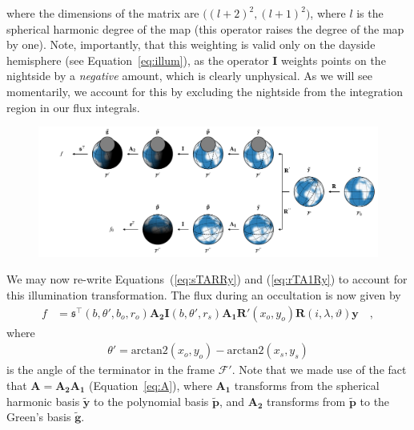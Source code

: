 \documentclass[modern]{aastex62}
\newcommand{\BF}[1]{\ensuremath{\mathbf{#1}}}
\newcommand{\bg}{\ensuremath{\tilde{\BF{g}}}}
\newcommand{\bp}{\ensuremath{\tilde{\BF{p}}}}
\newcommand{\by}{\ensuremath{\tilde{\BF{y}}}}
\begin{document}
%
where the dimensions of the matrix are $\big((l + 2)^2, (l + 1)^2\big)$, where
$l$ is the spherical harmonic degree of the map (this operator raises the
degree of the map by one).
%
Note, importantly, that this weighting is valid only on the dayside
hemisphere (see Equation~\ref{eq:illum}), as the operator $\BF{I}$ weights
points on the nightside by a \emph{negative} amount, which is clearly
unphysical. As we will see momentarily, we account for this by excluding the
nightside from the integration region in our flux integrals.

\begin{figure}[t!]
    \begin{centering}
        \includegraphics[width=\linewidth]{figures/frames.pdf}
    \end{centering}
\end{figure}

We may now re-write Equations~(\ref{eq:sTARRy}) and (\ref{eq:rTA1Ry}) to
account for this illumination transformation. The flux during an occultation
is now given by
%
\begin{align}
    \label{eq:sTA2IA1RRy}
    f & =
    \mathfrak{s}^\top(b, \theta', b_o, r_o)
    \BF{A_2}
    \BF{I}(b, \theta', r_s)
    \BF{A_1}
    \BF{R}'(x_o, y_o)
    \BF{R}(i, \lambda, \vartheta)
    \BF{y}
    \quad,
\end{align}
%
where
%
\begin{align}
    \label{eq:theta'}
    \theta' = \mathrm{arctan2}(x_o, y_o) - \mathrm{arctan2}(x_s, y_s)
\end{align}
%
is the angle of the terminator in the frame $\mathcal{F}'$.
Note that we made use of the fact that
$\BF{A} = \BF{A_2} \BF{A_1}$
(Equation~\ref{eq:A}), where $\BF{A_1}$ transforms from
the spherical harmonic basis $\by$ to the polynomial basis $\bp$, and
$\BF{A_2}$ transforms from $\bp$ to the Green's basis $\bg$.
\end{document}

